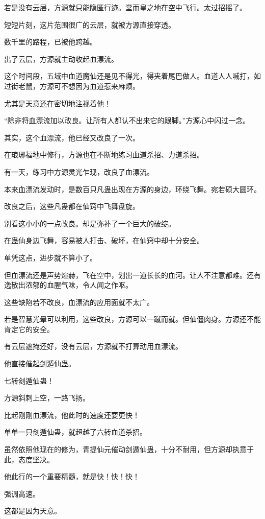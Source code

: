 \begin{this_body}
若是没有云层，方源就只能隐匿行迹。堂而皇之地在空中飞行。太过招摇了。

短短片刻，这片范围很广的云层，就被方源直接穿透。

数千里的路程，已被他跨越。

出了云层，方源就主动收起血漂流。

这个时间段，五域中血道魔仙还是见不得光，得夹着尾巴做人。血道人人喊打，如过街老鼠，方源可不想因为血道惹来麻烦。

尤其是天意还在密切地注视着他！

“除非将血漂流加以改良。让所有人都认不出来它的跟脚。”方源心中闪过一念。

其实，这个血漂流，他已经又改良了一次。

在琅琊福地中修行，方源也在不断地练习血道杀招、力道杀招。

有一天，练习中方源灵光乍现，改良了血漂流。

本来血漂流发动时，是数百只凡蛊出现在方源的身边，环绕飞舞。宛若硕大圆环。

改良之后，这些凡蛊都在仙窍中飞舞盘旋。

别看这小小的一点改良。却是弥补了一个巨大的破绽。

在蛊仙身边飞舞，容易被人打击、破坏，在仙窍中却十分安全。

单凭这点，进步就不算小了。

但血漂流还是声势煊赫，飞在空中，划出一道长长的血河。让人不注意都难。还有逸散出浓郁的血腥气味，令人闻之作呕。

这些缺陷若不改良，血漂流的应用面就不太广。

若是智慧光晕可以利用，这些改良，方源可以一蹴而就。但仙僵肉身。方源还不能肯定它的安全。

有云层遮掩还好，没有云层，方源就不打算动用血漂流。

他直接催起剑遁仙蛊。

七转剑遁仙蛊！

方源斜刺上空，一路飞扬。

比起刚刚血漂流，他此时的速度还要更快！

单单一只剑遁仙蛊，就超越了六转血道杀招。

虽然依照他现在的修为，青提仙元催动剑遁仙蛊，十分不耐用，但方源却执意于此，态度坚决。

他此行的一个重要精髓，就是快！快！快！

强调高速。

这都是因为天意。


\end{this_body}
